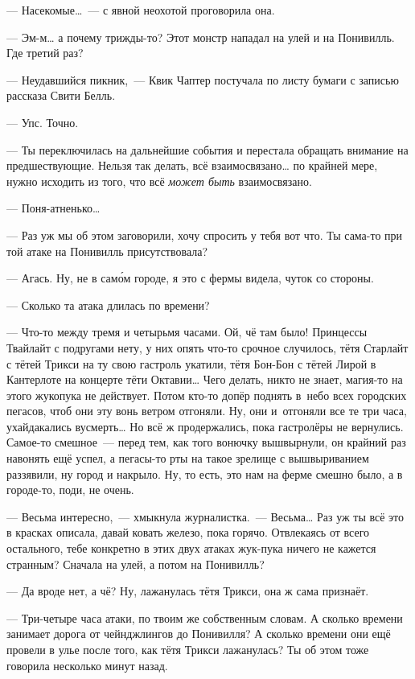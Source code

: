 \documentclass[fontsize=11pt,a5paper,titlepage=firstcover]{scrbook}
\begin{document}
--- Насекомые{\ldots}~--- с явной неохотой проговорила она.

--- Эм-м{\ldots} а почему трижды-то? Этот монстр нападал на улей и на Понивилль. Где третий раз?

--- Неудавшийся пикник,~--- Квик Чаптер постучала по листу бумаги с записью рассказа Свити Белль.

--- Упс. Точно.

--- Ты переключилась на дальнейшие события и перестала обращать внимание на предшествующие. Нельзя так делать, всё взаимосвязано{\ldots} по крайней мере, нужно исходить из того, что всё \emph{может быть} взаимосвязано.

--- Поня-атненько{\ldots}

--- Раз уж мы об этом заговорили, хочу спросить у тебя вот что. Ты сама-то при той атаке на Понивилль присутствовала?

--- Агась. Ну, не в само́м городе, я это с фермы видела, чуток со стороны.

--- Сколько та атака длилась по времени?

--- Что-то между тремя и четырьмя часами. Ой, чё там было! Принцессы Твайлайт с подругами нету, у них опять что-то срочное случилось, тётя Старлайт с тётей Трикси на ту свою гастроль укатили, тётя Бон-Бон с тётей Лирой в Кантерлоте на концерте тёти Октавии{\ldots} Чего делать, никто не знает, магия-то на этого жукопука не действует. Потом кто-то допёр поднять в~небо всех городских пегасов, чтоб они эту вонь ветром отгоняли. Ну, они и~отгоняли все те три часа, ухайдакались вусмерть{\ldots} Но всё ж продержались, пока гастролёры не вернулись. Самое-то смешное~--- перед тем, как того вонючку вышвырнули, он крайний раз навонять ещё успел, а пегасы-то рты на такое зрелище с вышвыриванием раззявили, ну город и накрыло. Ну, то есть, это нам на ферме смешно было, а в городе-то, поди, не очень.

--- Весьма интересно,~--- хмыкнула журналистка.~--- Весьма{\ldots} Раз уж ты всё это в красках описала, давай ковать железо, пока горячо. Отвлекаясь от всего остального, тебе конкретно в этих двух атаках жук-пука ничего не кажется странным? Сначала на улей, а потом на Понивилль?

--- Да вроде нет, а чё? Ну, лажанулась тётя Трикси, она ж сама признаёт.

--- Три-четыре часа атаки, по твоим же собственным словам. А сколько времени занимает дорога от чейнджлингов до Понивилля? А сколько времени они ещё провели в улье после того, как тётя Трикси лажанулась? Ты об этом тоже говорила несколько минут назад.
\end{document}
